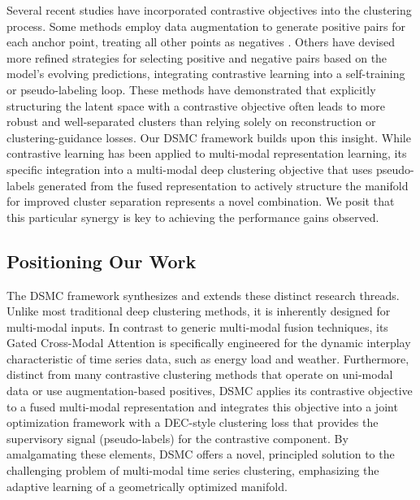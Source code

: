 \documentclass[journal]{IEEEtran}
\begin{document}
Several recent studies have incorporated contrastive objectives into the clustering process. Some methods employ data augmentation to generate positive pairs for each anchor point, treating all other points as negatives \cite{contrastive_clustering_li}. Others have devised more refined strategies for selecting positive and negative pairs based on the model's evolving predictions, integrating contrastive learning into a self-training or pseudo-labeling loop. These methods have demonstrated that explicitly structuring the latent space with a contrastive objective often leads to more robust and well-separated clusters than relying solely on reconstruction or clustering-guidance losses. Our DSMC framework builds upon this insight. While contrastive learning has been applied to multi-modal representation learning, its specific integration into a multi-modal deep clustering objective that uses pseudo-labels generated from the fused representation to actively structure the manifold for improved cluster separation represents a novel combination. We posit that this particular synergy is key to achieving the performance gains observed.

\subsection{Positioning Our Work}
The DSMC framework synthesizes and extends these distinct research threads. Unlike most traditional deep clustering methods, it is inherently designed for multi-modal inputs. In contrast to generic multi-modal fusion techniques, its Gated Cross-Modal Attention is specifically engineered for the dynamic interplay characteristic of time series data, such as energy load and weather. Furthermore, distinct from many contrastive clustering methods that operate on uni-modal data or use augmentation-based positives, DSMC applies its contrastive objective to a fused multi-modal representation and integrates this objective into a joint optimization framework with a DEC-style clustering loss that provides the supervisory signal (pseudo-labels) for the contrastive component. By amalgamating these elements, DSMC offers a novel, principled solution to the challenging problem of multi-modal time series clustering, emphasizing the adaptive learning of a geometrically optimized manifold.
\end{document}
